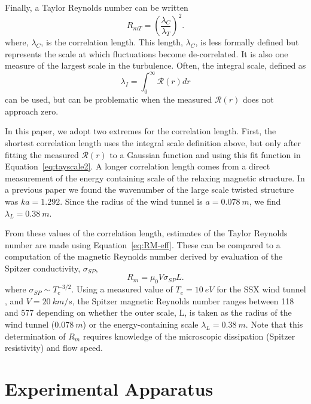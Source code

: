 \documentclass[aip,prl,amsmath,amssymb,reprint,superscriptaddress]{revtex4-1} %
\begin{document}
Finally, a Taylor Reynolds number can be written~\cite{frisch95}
%
\begin{equation}
R_{mT}  = \left(\frac{\lambda_{C}}{\lambda_T} \right)^2 .
\label{eq:RM-eff}
\end{equation}
%
where, $\lambda_{C}$, is the correlation length. This length, $\lambda_{C}$, is less formally defined but represents the scale at which fluctuations become de-correlated.  It is also one measure of the largest scale in the turbulence.  Often, the integral scale, defined as
%
\begin{equation}
\lambda_{I}  = \int_0^\infty \mathcal{R}(r) dr
\label{eq:tayscale2}
\end{equation}
%
can be used, but can be problematic when the measured $\mathcal{R}(r)$ does not approach zero. 

In this paper, we adopt two extremes for the correlation length.  First, the shortest correlation length uses the integral scale definition above, but only after fitting the measured $\mathcal{R}(r)$ to a Gaussian function and using this fit function in Equation~\ref{eq:tayscale2}.  A longer correlation length comes from a direct measurement of the energy containing scale of the relaxing magnetic structure.  In a previous paper \cite{Gray13} we found the wavenumber of the large scale twisted structure was $k a = 1.292$.  Since the radius of the wind tunnel is $a = 0.078~m$, we find $\lambda_{L} = 0.38~m$.  

From these values of the correlation length, estimates of the Taylor Reynolds number are made using Equation~\ref{eq:RM-eff}. These can be compared to a computation of the magnetic Reynolds number derived by evaluation of the Spitzer conductivity, $\sigma_{SP}$,
\begin{equation}
R_m = \mu_0 V \sigma_{SP} L.
\label{eq:RM-calc} 
\end{equation}
%
where $\sigma_{SP}\sim T_{e}^{-3/2}$. Using a measured value of $T_e = 10~eV$ for the SSX wind tunnel \cite{Zhang11}, and $V=20~km/s$, the Spitzer magnetic Reynolds number ranges between 118 and 577 depending on whether the outer scale, L, is taken as the radius of the wind tunnel ($0.078~m$) or the energy-containing scale $\lambda_{L} = 0.38~m$.  Note that this determination of $R_m$ requires knowledge of the microscopic dissipation (Spitzer resistivity) and flow speed.

\section{Experimental Apparatus}
\end{document}
